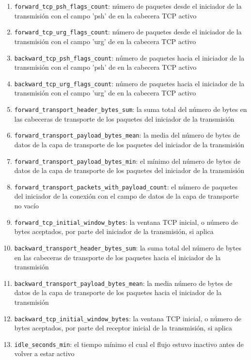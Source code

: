 \begin{enumerate}
  \item \texttt{forward\_tcp\_psh\_flags\_count}: número de paquetes desde el iniciador de la transmisión con el campo 'psh' de en la cabecera TCP activo
  \item \texttt{forward\_tcp\_urg\_flags\_count}: número de paquetes desde el iniciador de la transmisión con el campo 'urg' de en la cabecera TCP activo
  \item \texttt{backward\_tcp\_psh\_flags\_count}: número de paquetes hacia el iniciador de la transmisión con el campo 'psh' de en la cabecera TCP activo
  \item \texttt{backward\_tcp\_urg\_flags\_count}: número de paquetes hacia el iniciador de la transmisión con el campo 'urg' de en la cabecera TCP activo
  \item \texttt{forward\_transport\_header\_bytes\_sum}: la suma total del número de bytes en las cabeceras de transporte de los paquetes del iniciador de la transmisión
  \item \texttt{forward\_transport\_payload\_bytes\_mean}: la media del número de bytes de datos de la capa de transporte de los paquetes del iniciador de la transmisión
  \item \texttt{forward\_transport\_payload\_bytes\_min}: el mínimo del número de bytes de datos de la capa de transporte de los paquetes del iniciador de la transmisión
  \item \texttt{forward\_transport\_packets\_with\_payload\_count}: el número de paquetes del iniciador de la conexión con el campo de datos de la capa de transporte no vacío
  \item \texttt{forward\_tcp\_initial\_window\_bytes}: la ventana TCP inicial, o número de bytes aceptados, por parte del iniciador de la transmisión, si aplica
  \item \texttt{backward\_transport\_header\_bytes\_sum}: la suma total del número de bytes en las cabeceras de transporte de los paquetes hacia el iniciador de la transmisión
  \item \texttt{backward\_transport\_payload\_bytes\_mean}: la media número de bytes de datos de la capa de transporte de los paquetes hacia el iniciador de la transmisión
  \item \texttt{backward\_tcp\_initial\_window\_bytes}: la ventana TCP inicial, o número de bytes aceptados, por parte del receptor inicial de la transmisión, si aplica
  \item \texttt{idle\_seconds\_min}: el tiempo mínimo el cual el flujo estuvo inactivo antes de volver a estar activo

\end{enumerate}
